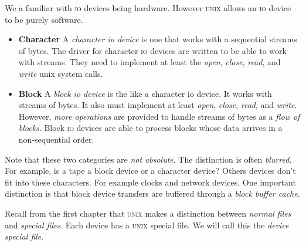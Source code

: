 We a familiar with \textsc{io} devices being hardware.
However \textsc{unix} allows an \textsc{io} device to be purely software. 


\begin{itemize}   
\renewcommand{\labelitemi}{$\Box$}
\item \textbf{Character} 
A \textit{character io device} is one that works with a sequential streams of bytes. 
The driver for character \textsc{io} devices are written to be able to work with streams.
They need to implement at least the \textit{open}, \textit{close}, \textit{read}, and 
\textit{write} unix system calls. 
\item \textbf{Block} 
A \textit{block io device} is the like a character io device. 
It works with streams of bytes. It also must implement at least 
\textit{open}, \textit{close}, \textit{read}, and \textit{write}. 
However, \textit{more operations} are provided to handle streams of bytes as 
a \textit{flow of blocks}. Block \textsc{io} devices are 
able to process blocks whose data arrives in a non-sequential order.
\end{itemize}

Note that these two categories are \textit{not absolute}. 
The distinction is often \textit{blurred}. For example, is a tape a 
block device or a character device? Others devices don't fit 
into these characters.
For example clocks and network devices.
One important distinction is that block device transfers 
are buffered through a \textit{block buffer cache}.




\frmrule


Recall from the first chapter that \textsc{unix} makes a distinction between \textit{normal files}
and \textit{special files}. Each device has a \textsc{unix} special file.
We will call this the \textit{device special file}. 


\begin{figure}[h]
\end{figure}

